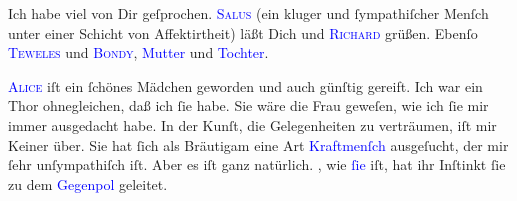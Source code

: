 \pstart
           Ich habe viel von Dir geſprochen. \textsc{\textcolor{blue}{Salus}{}\ledrightnote{\textcolor{blue}{Hugo Salus}}} (ein kluger und ſympathiſcher Menſch unter einer Schicht von Affektirtheit)
               läßt Dich und \textsc{\textcolor{blue}{Richard}{}\ledrightnote{\textcolor{blue}{Richard Beer-Hofmann}}} grüßen. Ebenſo \textsc{\textcolor{blue}{Teweles}{}\ledrightnote{\textcolor{blue}{Heinrich Teweles}}} und \textsc{\textcolor{blue}{Bondy}{}\ledrightnote{{$\rightarrow$}\textcolor{blue}{Charlotte Bondy}{\newline}{$\rightarrow$}\textcolor{blue}{Alice Ziegler}}}, \textcolor{blue}{Mutter}{}\ledrightnote{{$\rightarrow$}\textcolor{blue}{Charlotte Bondy}} und \textcolor{blue}{Tochter}{}\ledrightnote{{$\rightarrow$}\textcolor{blue}{Alice Ziegler}}.\pend
           
\pstart
           \textsc{\textcolor{blue}{Alice}{}\ledrightnote{\textcolor{blue}{Alice Ziegler}}} iſt ein ſchönes Mädchen geworden und auch günſtig gereift. Ich war ein Thor
               ohnegleichen, daß ich ſie \label{K_L03203-1v}\label{K_L03203-1h} habe. Sie wäre die Frau geweſen, wie ich ſie mir immer ausgedacht habe. In
               der Kunſt, die Gelegenheiten zu verträumen, iſt mir Keiner über. Sie hat ſich als
               Bräutigam eine Art \textcolor{blue}{Kraftmenſch}{}\ledrightnote{{$\rightarrow$}\textcolor{blue}{Arnost Ziegler}} ausgeſucht, der mir {\pb}ſehr
               unſympathiſch iſt. Aber es iſt ganz natürlich. \label{K_L03203-2v}\label{K_L03203-2h}, wie
                  \textcolor{blue}{ſie}{}\ledrightnote{{$\rightarrow$}\textcolor{blue}{Alice Ziegler}} iſt, hat ihr
               Inſtinkt  ſie zu dem \textcolor{blue}{Gegenpol}{}\ledrightnote{{$\rightarrow$}\textcolor{blue}{Arnost Ziegler}}{ }\label{K_L03203-3v}\label{K_L03203-3h}
               geleitet.\pend
           
